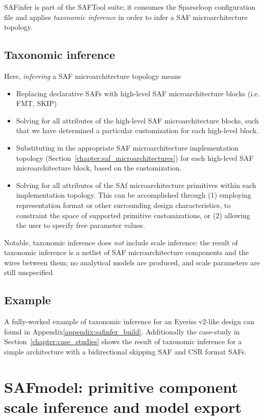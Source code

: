 SAFinfer is part of the SAFTool suite; it consumes the Sparseloop configuration file and applies \textit{taxonomic inference} in order to infer a SAF microarchitecture topology.

\subsection{Taxonomic inference}

Here, \textit{inferring} a SAF microarchitecture topology means

\begin{itemize}
\item Replacing declarative SAFs with high-level SAF microarchitecture blocks (i.e. FMT, SKIP) 
\item Solving for all attributes of the high-level SAF microarchitecture blocks, such that we have determined a particular customization for each high-level block.
\item Substituting in the appropriate SAF microarchitecture implementation topology (Section~\ref{chapter:saf_microarchitectures}) for each high-level SAF microarchitecture block, based on the customization.
\item Solving for all attributes of the SAf microarchitecture primitives within each implementation topology. This can be accomplished through (1) employing representation format or other surrounding design characteristics, to constraint the space of supported primitive customizations, or (2) allowing the user to specify free parameter values.
\end{itemize}

Notable, taxonomic inference does \textit{not} include scale inference: the result of taxonomic inference is a netlist of SAF microarchitecture components and the wires between them; no analytical models are produced, and scale parameters are still unspecified.

\subsection{Example}

A fully-worked example of taxonomic inference for an Eyeriss v2\cite{eyerissv2}-like design can found in Appendix\ref{appendix:safinfer_build}. Additionally the case-study in Section~\ref{chapter:case_studies} shows the result of taxonomic inference for a simple architecture with a bidirectional skipping SAF and CSR format SAFs.


\section{SAFmodel: primitive component scale inference and model export}

